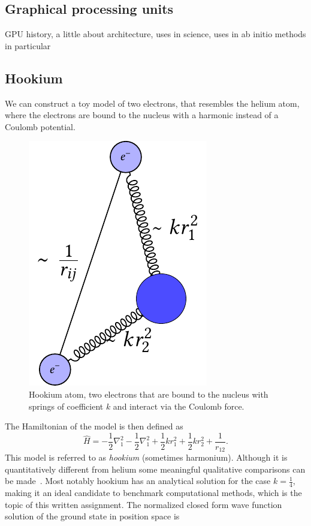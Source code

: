 \documentclass[final,3p,times,twocolumn]{elsarticle}
\begin{document}
		
	
	\subsection{Graphical processing units}
		GPU history,
		a little about architecture,
		uses in science, 
		uses in ab initio methods in particular
	
	\subsection{Hookium}
	We can construct a toy model of two electrons, that resembles the helium atom, where the electrons are bound to the nucleus with a harmonic instead of a Coulomb potential. 
	\begin{figure}[h]
		\centering
		\includegraphics[width=0.35\linewidth]{../diagrams/Hookium/hookium_diagram}
		\caption{Hookium atom, two electrons that are bound to the nucleus with springs of coefficient $k$ and interact via the Coulomb force.}
		\label{fig:hookiumdiagram}
	\end{figure}
	The Hamiltonian of the model is then defined as 
	\begin{equation}
		\hat{H}=-\frac{1}{2} \nabla_{1}^{2}-\frac{1}{2} \nabla_{1}^{2}+\frac{1}{2} k r_{1}^{2}+\frac{1}{2} k r_{2}^{2}+\frac{1}{r_{12}}.
	\end{equation}
	This model is referred to as \emph{hookium} (sometimes harmonium). Although it is quantitatively different from helium some meaningful qualitative comparisons can be made~\cite{ONeill2003wave}. Most notably hookium has an analytical solution for the case $k=\frac{1}{4}$, making it an ideal candidate to benchmark computational methods, which is the topic of this written assignment. The normalized closed form wave function solution of the ground state in position space is
\end{document}
